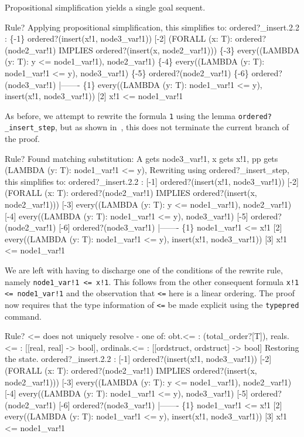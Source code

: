 \documentclass[11pt,twoside]{book}
\newcommand{\pvsref}[1]{\fbox{\footnotesize\ref{#1}}} \def\id#1{\hbox{\textt{#1}}} %
\begin{document}
Propositional simplification yields a single goal sequent.
\begin{session*}\label{subgoal2.2}
Rule? 
Applying propositional simplification,
this simplifies to: 
ordered?_insert.2.2 :  
\{-1\}   ordered?(insert(x!1, node3_var!1))
[-2]   (FORALL (x: T):
         ordered?(node2_var!1) IMPLIES ordered?(insert(x, node2_var!1)))
\{-3\}   every((LAMBDA (y: T): y <= node1_var!1), node2_var!1)
\{-4\}   every((LAMBDA (y: T): node1_var!1 <= y), node3_var!1)
\{-5\}   ordered?(node2_var!1)
\{-6\}   ordered?(node3_var!1)
  |-------
\{1\}   every((LAMBDA (y: T): node1_var!1 <= y), insert(x!1, node3_var!1))
[2]   x!1 <= node1_var!1
\end{session*}
As before, we attempt to rewrite the formula \texttt{1} using the
lemma \texttt{ordered?\_insert\_step}, but as shown in~\pvsref{2.2.proof.1},
this does not terminate 
the current branch of the proof.
\begin{session*}\label{2.2.proof.1}
Rule? 
Found matching substitution:
A gets node3_var!1,
x gets x!1,
pp gets (LAMBDA (y: T): node1_var!1 <= y),
Rewriting using ordered?_insert_step,
this simplifies to: 
ordered?_insert.2.2 :  
[-1]   ordered?(insert(x!1, node3_var!1))
[-2]   (FORALL (x: T):
         ordered?(node2_var!1) IMPLIES ordered?(insert(x, node2_var!1)))
[-3]   every((LAMBDA (y: T): y <= node1_var!1), node2_var!1)
[-4]   every((LAMBDA (y: T): node1_var!1 <= y), node3_var!1)
[-5]   ordered?(node2_var!1)
[-6]   ordered?(node3_var!1)
  |-------
\{1\}   node1_var!1 <= x!1
[2]   every((LAMBDA (y: T): node1_var!1 <= y), insert(x!1, node3_var!1))
[3]   x!1 <= node1_var!1
\end{session*}
  We are left with having to discharge one of
the conditions of the rewrite rule, namely \texttt{node1\_var!1 <= x!1}.
This follows from the other consequent formula \texttt{x!1 <=
node1\_var!1} and the observation that \texttt{<=} here is a linear
ordering.
The proof  now requires that the type information of
\texttt{<=} be made explicit using the \texttt{typepred} command.
\begin{session*}
Rule? 
<= does not uniquely resolve - one of:
  obt.<= : (total_order?[T]),
  reals.<= : [[real, real] -> bool],
  ordinals.<= : [[ordstruct, ordstruct] -> bool]
Restoring the state.
ordered?_insert.2.2 :  
[-1]   ordered?(insert(x!1, node3_var!1))
[-2]   (FORALL (x: T):
         ordered?(node2_var!1) IMPLIES ordered?(insert(x, node2_var!1)))
[-3]   every((LAMBDA (y: T): y <= node1_var!1), node2_var!1)
[-4]   every((LAMBDA (y: T): node1_var!1 <= y), node3_var!1)
[-5]   ordered?(node2_var!1)
[-6]   ordered?(node3_var!1)
  |-------
\{1\}   node1_var!1 <= x!1
[2]   every((LAMBDA (y: T): node1_var!1 <= y), insert(x!1, node3_var!1))
[3]   x!1 <= node1_var!1
\end{session*}
\end{document}
